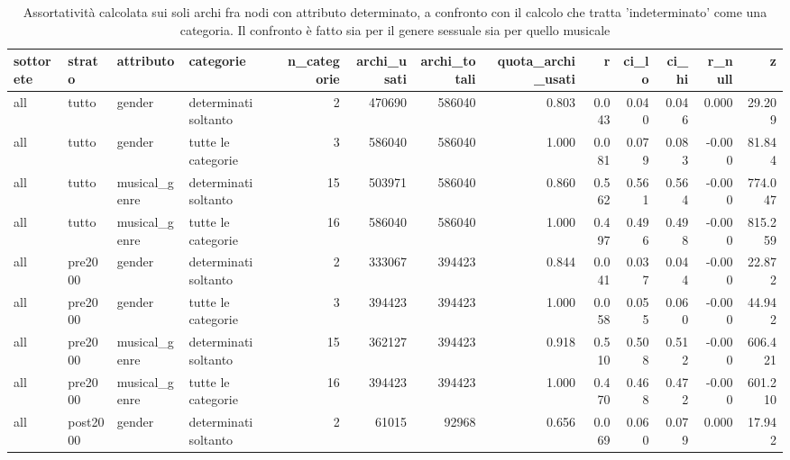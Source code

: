 \begin{table}
\centering
\caption{Assortatività calcolata sui soli archi fra nodi con attributo determinato, a confronto con il calcolo che tratta 'indeterminato' come una categoria. Il confronto è fatto sia per il genere sessuale sia per quello musicale}
\label{tab:t3_assortativita_MF_vs_tutte}
\begin{tabular}{llllrrrrrrrrr}
\toprule
  sottorete &   strato &     attributo &            categorie &  n\_categorie &  archi\_usati &  archi\_totali &  quota\_archi\_usati &     r &  ci\_lo &  ci\_hi &  r\_null &       z \\
\midrule
        all &    tutto &        gender & determinati soltanto &            2 &       470690 &        586040 &              0.803 & 0.043 &  0.040 &  0.046 &   0.000 &  29.209 \\
        all &    tutto &        gender &   tutte le categorie &            3 &       586040 &        586040 &              1.000 & 0.081 &  0.079 &  0.083 &  -0.000 &  81.844 \\
        all &    tutto & musical\_genre & determinati soltanto &           15 &       503971 &        586040 &              0.860 & 0.562 &  0.561 &  0.564 &  -0.000 & 774.047 \\
        all &    tutto & musical\_genre &   tutte le categorie &           16 &       586040 &        586040 &              1.000 & 0.497 &  0.496 &  0.498 &  -0.000 & 815.259 \\
        all &  pre2000 &        gender & determinati soltanto &            2 &       333067 &        394423 &              0.844 & 0.041 &  0.037 &  0.044 &  -0.000 &  22.872 \\
        all &  pre2000 &        gender &   tutte le categorie &            3 &       394423 &        394423 &              1.000 & 0.058 &  0.055 &  0.060 &  -0.000 &  44.942 \\
        all &  pre2000 & musical\_genre & determinati soltanto &           15 &       362127 &        394423 &              0.918 & 0.510 &  0.508 &  0.512 &  -0.000 & 606.421 \\
        all &  pre2000 & musical\_genre &   tutte le categorie &           16 &       394423 &        394423 &              1.000 & 0.470 &  0.468 &  0.472 &  -0.000 & 601.210 \\
        all & post2000 &        gender & determinati soltanto &            2 &        61015 &         92968 &              0.656 & 0.069 &  0.060 &  0.079 &   0.000 &  17.942 \\

\end{tabular}
\end{table}

